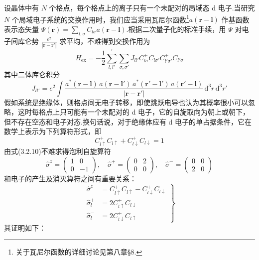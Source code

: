 设晶体中有 $N$ 个格点，每个格点上的离子只有一个未配对的局域态 d 电子.当研究 $N$ 个局域电子系统的交换作用时，我们应当采用瓦尼尔函数\footnote{关于瓦尼尔函数的详细讨论见第八章§8.}$a\left(\boldsymbol{r}-\boldsymbol{l}\right)$ 作基函数表示态矢量
$\Psi\left(\boldsymbol{r}\right)=\sum_{l,\sigma}C_{l\sigma}a\left(\boldsymbol{r}-\boldsymbol{l}\right)$.根据二次量子化的标准手续，用 $\Psi$ 对电子间库仑势 $\frac{e^2}{\left|\boldsymbol{r}-\boldsymbol{r}'\right|}$ 求平均，不难得到交换作用为
\begin{equation}
  H_{\mathrm{ex}}=-\frac{1}{2}\sum_{l,l'}^{\prime}\sum_{\sigma,\sigma'}J_{ll'}
  C_{l\sigma}^{+}C_{l\sigma'}C_{l'\sigma'}^{+}C_{l'\sigma}
\end{equation}
其中二体库仑积分
\begin{equation}
  J_{ll'}=e^2\int\frac{a^{*}\left(\boldsymbol{r}-\boldsymbol{l}\right)\,a\left(\boldsymbol{r}-\boldsymbol{l}'\right)\,
  a^{*}\left(\boldsymbol{r}'-\boldsymbol{l}'\right)\,a\left(\boldsymbol{r}'-\boldsymbol{l}\right)}
  {\left|\boldsymbol{r}-\boldsymbol{r}'\right|}\,\mathrm{d}^3r\,\mathrm{d}^3r'
\end{equation}
假如系统是绝缘体，则格点间无电子转移，即使跳跃电导也认为其概率很小可以忽略，这时每格点上只可能有一个未配对的 d 电子，它的自旋取向为朝上或朝下，但不存在空态和电子对态.换句话说，对于绝缘体应有 d 电子的单占据条件，它在数学上表示为下列算符形式，即
\begin{equation}
  C_{l\uparrow}^{+}C_{l\uparrow}+C_{l\downarrow}^{+}C_{l\downarrow}=1
\end{equation}
由式(3.2.10)不难求得泡利自旋算符
\begin{equation}
  \hat{\sigma}^{z}=\begin{pmatrix}1&0\\0&-1\end{pmatrix},\quad
  \hat{\sigma}^{+}=\begin{pmatrix}0&2\\0&0\end{pmatrix},\quad
  \hat{\sigma}^{-}=\begin{pmatrix}0&0\\2&0\end{pmatrix}
\end{equation}
和电子的产生及消灭算符之间有重要关系：
\begin{equation}
  \left.\begin{aligned}
    \hat{\sigma}^{z}&=C_{l\uparrow}^{+}C_{l\uparrow}-C_{l\downarrow}^{+}C_{l\downarrow}\\
    \hat{\sigma}_l^{+}&=2C_{l\uparrow}^{+}C_{l\downarrow}\\
    \hat{\sigma}_l^{-}&=2C_{l\downarrow}^{+}C_{l\uparrow}
  \end{aligned}\right\}
\end{equation}
其证明如下：

